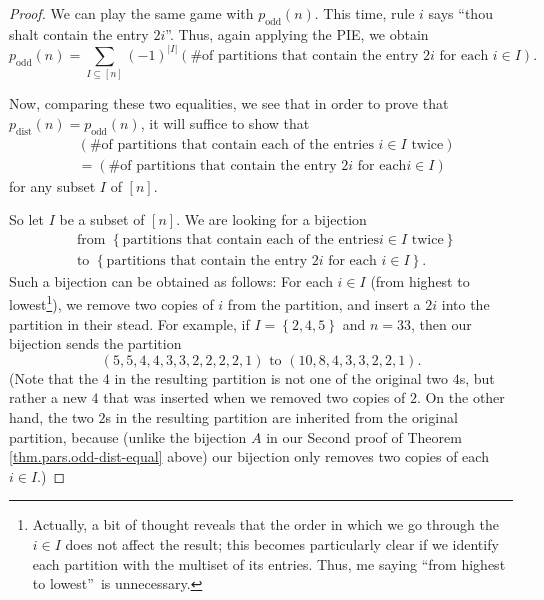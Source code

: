 \begin{proof}
We can play the same game with $p_{\operatorname*{odd}}\left(  n\right)  $.
This time, rule $i$ says \textquotedblleft thou shalt contain the entry
$2i$\textquotedblright. Thus, again applying the PIE, we obtain%
\begin{equation}
p_{\operatorname*{odd}}\left(  n\right)  =\sum_{I\subseteq\left[  n\right]
}\left(  -1\right)  ^{\left\vert I\right\vert }\left(  \text{\# of partitions
that contain the entry }2i\text{ for each }i\in I\right)  .
\label{pf.thm.pars.odd-dist-equal.3rd.4}%
\end{equation}


Now, comparing these two equalities, we see that in order to prove that
$p_{\operatorname*{dist}}\left(  n\right)  =p_{\operatorname*{odd}}\left(
n\right)  $, it will suffice to show that%
\begin{align*}
&  \left(  \text{\# of partitions that contain each of the entries }i\in
I\text{ twice}\right) \\
&  =\left(  \text{\# of partitions that contain the entry }2i\text{ for each
}i\in I\right)
\end{align*}
for any subset $I$ of $\left[  n\right]  $.

So let $I$ be a subset of $\left[  n\right]  $. We are looking for a
bijection
\begin{align*}
&  \text{from }\left\{  \text{partitions that contain each of the entries
}i\in I\text{ twice}\right\} \\
&  \text{to }\left\{  \text{partitions that contain the entry }2i\text{ for
each }i\in I\right\}  .
\end{align*}
Such a bijection can be obtained as follows: For each $i\in I$ (from highest
to lowest\footnote{Actually, a bit of thought reveals that the order in which
we go through the $i\in I$ does not affect the result; this becomes
particularly clear if we identify each partition with the multiset of its
entries. Thus, me saying \textquotedblleft from highest to
lowest\textquotedblright\ is unnecessary.}), we remove two copies of $i$ from
the partition, and insert a $2i$ into the partition in their stead. For
example, if $I=\left\{  2,4,5\right\}  $ and $n=33$, then our bijection sends
the partition
\[
\left(  5,5,4,4,3,3,2,2,2,2,1\right)  \text{ to }\left(
10,8,4,3,3,2,2,1\right)  .
\]
(Note that the $4$ in the resulting partition is not one of the original two
$4$s, but rather a new $4$ that was inserted when we removed two copies of
$2$. On the other hand, the two $2$s in the resulting partition are inherited
from the original partition, because (unlike the bijection $A$ in our Second
proof of Theorem \ref{thm.pars.odd-dist-equal} above) our bijection only
removes two copies of each $i\in I$.)


\end{proof}
